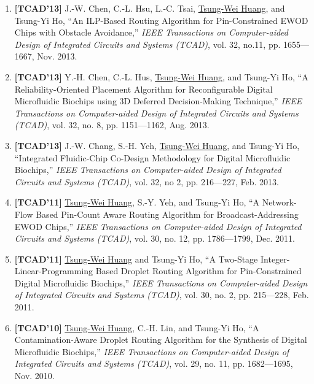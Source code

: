 \documentclass[A4,11pt]{article}
\begin{document}
\begin{enumerate}
  \item \textbf{[TCAD'13]} J.-W. Chen, C.-L. Hsu, L.-C. Tsai, \underline{Tsung-Wei Huang}, and Tsung-Yi Ho, ``An ILP-Based Routing Algorithm for Pin-Constrained EWOD Chips with Obstacle Avoidance,'' \textit{IEEE Transactions on Computer-aided Design of Integrated Circuits and Systems (TCAD)}, vol. 32, no.11, pp. 1655—1667, Nov. 2013.

  \item \textbf{[TCAD'13]} Y.-H. Chen, C.-L. Hus, \underline{Tsung-Wei Huang}, and Tsung-Yi Ho, ``A Reliability-Oriented Placement Algorithm for Reconfigurable Digital Microfluidic Biochips using 3D Deferred Decision-Making Technique,'' \textit{IEEE Transactions on Computer-aided Design of Integrated Circuits and Systems (TCAD)}, vol. 32, no. 8, pp. 1151—1162, Aug. 2013.

  \item \textbf{[TCAD'13]} J.-W. Chang, S.-H. Yeh, \underline{Tsung-Wei Huang}, and Tsung-Yi Ho, ``Integrated Fluidic-Chip Co-Design Methodology for Digital Microfluidic Biochips,'' \textit{IEEE Transactions on Computer-aided Design of Integrated Circuits and Systems (TCAD)}, vol. 32, no 2, pp. 216—227, Feb. 2013.

  \item \textbf{[TCAD'11]} \underline{Tsung-Wei Huang}, S.-Y. Yeh, and Tsung-Yi Ho, ``A Network-Flow Based Pin-Count Aware Routing Algorithm for Broadcast-Addressing EWOD Chips,'' \textit{IEEE Transactions on Computer-aided Design of Integrated Circuits and Systems (TCAD)}, vol. 30, no. 12, pp. 1786—1799, Dec. 2011.

  \item \textbf{[TCAD'11]} \underline{Tsung-Wei Huang} and Tsung-Yi Ho, ``A Two-Stage Integer-Linear-Programming Based Droplet Routing Algorithm for Pin-Constrained Digital Microfluidic Biochips,'' \textit{IEEE Transactions on Computer-aided Design of Integrated Circuits and Systems (TCAD)}, vol. 30, no. 2, pp. 215—228, Feb. 2011. 

  \item \textbf{[TCAD'10]} \underline{Tsung-Wei Huang}, C.-H. Lin, and Tsung-Yi Ho, ``A Contamination-Aware Droplet Routing Algorithm for the Synthesis of Digital Microfluidic Biochips,'' \textit{IEEE Transactions on Computer-aided Design of Integrated Circuits and Systems (TCAD)}, vol. 29, no. 11, pp. 1682—1695, Nov. 2010. 

 \end{enumerate}

\end{document}

